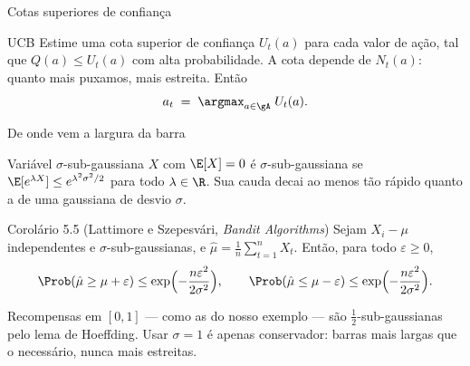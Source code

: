 \documentclass[aspectratio=169, 10pt]{beamer}
\newcommand{\Qhat}{\widehat{Q}}
\newcommand{\muhat}{\hat{\mu}}
\newcommand{\Nc}{N}                         %
\begin{document}
\begin{frame}{Cotas superiores de confiança}
  \begin{defbox}{UCB}
    Estime uma cota superior de confiança $U_t(a)$ para cada valor de
    ação, tal que $Q(a) \le U_t(a)$ com alta probabilidade. A cota
    depende de $\Nc_t(a)$: quanto mais puxamos, mais estreita. Então
    \[
      a_t \;=\; \argmax_{a \in \gA} \; U_t(a).
    \]
  \end{defbox}

  \centering
\end{frame}

\begin{frame}{De onde vem a largura da barra}
  \begin{defbox}{Variável $\sigma$-sub-gaussiana}
    $X$ com $\E[X] = 0$ é $\sigma$-sub-gaussiana se
    $\E[e^{\lambda X}] \le e^{\lambda^2\sigma^2/2}$ para todo
    $\lambda \in \R$. Sua cauda decai ao menos tão rápido quanto a de uma
    gaussiana de desvio $\sigma$.
  \end{defbox}

  \begin{teobox}{Corolário 5.5 (Lattimore e Szepesvári, \emph{Bandit Algorithms})}
    Sejam $X_i - \mu$ independentes e $\sigma$-sub-gaussianas, e
    $\muhat = \frac{1}{n}\sum_{t=1}^{n} X_t$. Então, para todo
    $\varepsilon \ge 0$,
    \[
      \Prob(\muhat \ge \mu + \varepsilon) \le \exp\Bigl(-\frac{n\varepsilon^2}{2\sigma^2}\Bigr),
      \qquad
      \Prob(\muhat \le \mu - \varepsilon) \le \exp\Bigl(-\frac{n\varepsilon^2}{2\sigma^2}\Bigr).
    \]
  \end{teobox}

  \begin{ideiabox}
    Recompensas em $[0,1]$ --- como as do nosso exemplo --- são
    $\tfrac12$-sub-gaussianas pelo lema de Hoeffding. Usar $\sigma = 1$ é
    apenas conservador: barras mais largas que o necessário, nunca mais
    estreitas.
  \end{ideiabox}
\end{frame}
\end{document}
